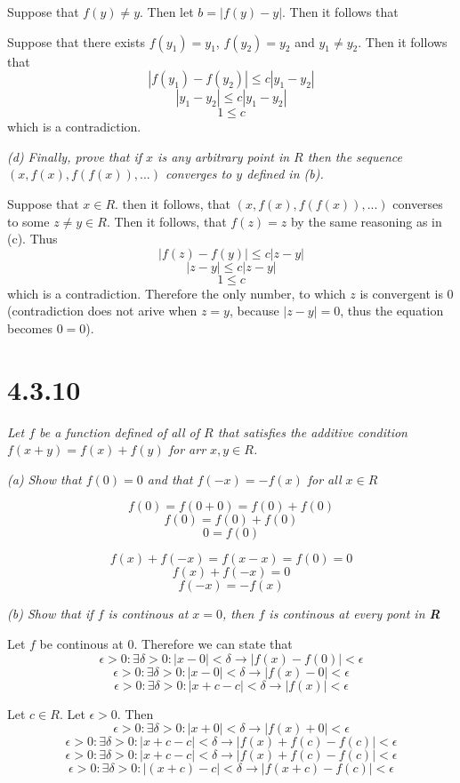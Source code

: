 \documentclass[11pt,oneside,titlepage]{book}
\begin{document}
Suppose that $f(y) \neq y$. Then let $b = |f(y) - y|$. Then it follows that


Suppose that there exists  $f(y_1) = y_1$, $f(y_2) = y_2$ and $y_1 \neq y_2$.
Then it follows that 
$$|f(y_1) - f(y_2)| \leq c|y_1 - y_2|$$
$$|y_1 - y_2| \leq c|y_1 - y_2|$$
$$1 \leq c$$
which is a contradiction.

\textit{(d) Finally, prove that if $x$ is any arbitrary point in $R$ then the
  sequence $(x, f(x), f(f(x)), ...)$ converges to $y$ defined in (b).}

Suppose that $x \in R$. then it follows, that
$(x, f(x), f(f(x)), ... )$ converses to some $z \neq y \in R$. Then
it follows, that $f(z) = z$ by the same reasoning as in (c). Thus
$$|f(z) - f(y)| \leq c|z - y|$$
$$|z - y| \leq c|z - y|$$
$$1 \leq c$$
which is a contradiction. Therefore the only number, to which $z$ is convergent
is $0$ (contradiction does not arive when $z = y$, because $|z - y| = 0$,
thus the equation becomes $0 = 0$).

\section*{4.3.10}
\textit{Let $f$ be a function defined of all of $R$ that satisfies the additive
  condition $f(x + y) = f(x) + f(y)$ for arr $x, y \in R$.}

\textit{(a) Show that $f(0) = 0$ and that $f(-x) = -f(x)$ for all $x \in R$ }

$$f(0) = f(0 + 0) = f(0) + f(0)$$
$$f(0) = f(0) + f(0)$$
$$0  = f(0)$$

$$f(x) + f(-x) = f(x - x)  = f(0) = 0$$
$$f(x) + f(-x)  = 0$$
$$ f(-x)  = - f(x)$$

\textit{(b) Show that if $f$ is continous at $x = 0$, then $f$ is continous
  at every pont in \textbf{R}}

Let $f$ be continous at $0$. Therefore we can state that
$$\epsilon > 0: \exists \delta > 0: |x - 0| < \delta \to |f(x) - f(0)| < \epsilon$$
$$\epsilon > 0: \exists \delta > 0: |x - 0| < \delta \to |f(x) - 0| < \epsilon$$
$$\epsilon > 0: \exists \delta > 0: |x + c - c| < \delta \to |f(x)| < \epsilon$$

Let $c \in R$. Let $\epsilon > 0$. Then
$$\epsilon > 0: \exists \delta > 0: |x + 0| < \delta \to |f(x) + 0| < \epsilon$$
$$\epsilon > 0: \exists \delta > 0: |x + c - c| < \delta \to |f(x) + f(c) - f(c)| < \epsilon$$
$$\epsilon > 0: \exists \delta > 0: |x + c - c| < \delta \to |f(x) + f(c) - f(c)| < \epsilon$$
$$\epsilon > 0: \exists \delta > 0: |(x + c) - c| < \delta \to |f(x + c) - f(c)| < \epsilon$$
\end{document}

